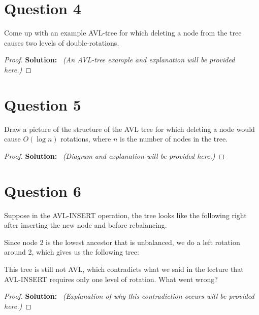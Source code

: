 \documentclass[12pt]{article}
\begin{document}
\pagebreak

\section*{Question 4}
Come up with an example AVL-tree for which deleting a node from the tree causes two levels of double-rotations.

\begin{proof}
\textbf{Solution:} \
\textit{(An AVL-tree example and explanation will be provided here.)}
\end{proof}

\pagebreak

\section*{Question 5}
Draw a picture of the structure of the AVL tree for which deleting a node would cause \( O(\log n) \) rotations, where \( n \) is the number of nodes in the tree.

\begin{proof}
\textbf{Solution:} \
\textit{(Diagram and explanation will be provided here.)}
\end{proof}

\pagebreak

\section*{Question 6}
Suppose in the AVL-INSERT operation, the tree looks like the following right after inserting the new node and before rebalancing.

\begin{center}
\end{center}

Since node 2 is the lowest ancestor that is unbalanced, we do a left rotation around 2, which gives us the following tree:

\begin{center}
\end{center}

This tree is still not AVL, which contradicts what we said in the lecture that AVL-INSERT requires only one level of rotation. What went wrong?

\begin{proof}
\textbf{Solution:} \
\textit{(Explanation of why this contradiction occurs will be provided here.)}
\end{proof}
\end{document}
